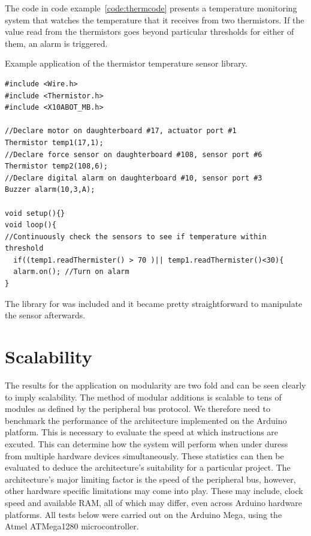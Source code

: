 The code in code example~\ref{code:thermcode} presents a temperature monitoring system that watches the temperature that it receives from two thermistors. If the value read from the thermistors goes beyond particular thresholds for either of them, an alarm is triggered.
\begin{listing}[H]
		\footnotesize
		\caption{Example application of the thermistor temperature sensor library.} \label{code:thermcode}
		\begin{verbatim}
#include <Wire.h>  
#include <Thermistor.h>  
#include <X10ABOT_MB.h>

//Declare motor on daughterboard #17, actuator port #1
Thermistor temp1(17,1);
//Declare force sensor on daughterboard #108, sensor port #6
Thermistor temp2(108,6);
//Declare digital alarm on daughterboard #10, sensor port #3
Buzzer alarm(10,3,A);

void setup(){}
void loop(){
//Continuously check the sensors to see if temperature within threshold
  if((temp1.readThermister() > 70 )|| temp1.readThermister()<30){
  alarm.on(); //Turn on alarm 
}
	\end{verbatim}
		
\end{listing}

The library for was included and it became pretty straightforward to manipulate the sensor afterwards.

\section{Scalability} %
\label{sec:scalability}

The results for the application on modularity are two fold and can be seen clearly to imply scalability. The method of modular additions is scalable to tens of modules as defined by the peripheral bus protocol. We therefore need to benchmark the performance of the architecture implemented on the Arduino platform. This is necessary to evaluate the speed at which instructions are excuted. This can determine how the system will perform when under duress from multiple hardware devices simultaneously. These statistics can then be evaluated to deduce the architecture's suitability for a particular project. The \xten architecture's major limiting factor is the speed of the peripheral bus, however, other hardware specific limitations may come into play. These may include, clock speed and available RAM, all of which may differ, even across Arduino hardware platforms. All tests below were carried out on the Arduino Mega, using the Atmel \texttrademark ATMega1280 microcontroller.

